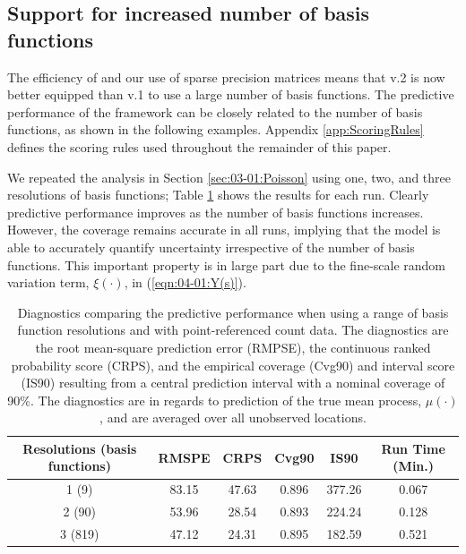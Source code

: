 \documentclass[article]{jss}
\begin{document}
\subsection{Support for increased number of basis functions}\label{sec:3:increased_resolution}

The efficiency of  and our use of sparse precision matrices means that  v.2 is now better equipped than  v.1 to use a large number of basis functions. 
The predictive performance of the framework can be closely related to the number of basis functions, as shown in the following examples. 
Appendix \ref{app:ScoringRules} defines the scoring rules used throughout the remainder of this paper. 



We repeated the analysis in Section \ref{sec:03-01:Poisson} using one, two, and three resolutions of basis functions; Table \ref{tab:03-02:PoissonScoringRules} shows the results for each run. 
Clearly predictive performance improves as the number of basis functions increases. However, the coverage remains accurate in all runs, implying that the model is able to accurately quantify uncertainty irrespective of the number of basis functions. 
 This important property is in large part due to the fine-scale random variation term, $\xi(\cdot)$, in (\ref{eqn:04-01:Y(s)}). 
\begin{table}[t!]
    \centering
    \caption{Diagnostics comparing the predictive performance when using a range of basis function resolutions and with point-referenced count data. The diagnostics are the root mean-square prediction error (RMPSE), the continuous ranked probability score (CRPS), and the empirical coverage (Cvg90) and interval score (IS90) resulting from a central prediction interval with a nominal coverage of 90\%. The diagnostics are in regards to prediction of the true mean process, $\mu(\cdot)$, and are averaged over all unobserved locations.
    }
    \label{tab:03-02:PoissonScoringRules}
    \begin{tabular}{cccccc}
    \hline
    Resolutions (basis functions) & RMSPE  & CRPS & Cvg90 & IS90 & Run Time (Min.) \\
    \hline
    1 (9)    & 83.15    & 47.63 & 0.896  & 377.26  &  0.067  \\
    2 (90)   & 53.96    & 28.54 & 0.893  & 224.24 &  0.128   \\
    3 (819)  & 47.12    & 24.31 & 0.895  & 182.59 &  0.521 \\
    \hline
    \end{tabular}
\end{table}
\end{document}
